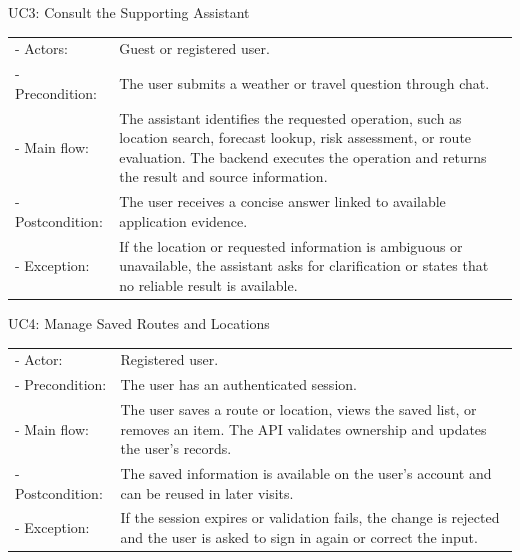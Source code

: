\begin{samepage}
\noindent UC3: Consult the Supporting Assistant\par\medskip
\begin{tabularx}{\textwidth}{@{}p{2.75cm}@{\quad}X@{}}
- Actors: & Guest or registered user. \\
- Precondition: & The user submits a weather or travel question through chat. \\
- Main flow: & The assistant identifies the requested operation, such as location search, forecast lookup, risk assessment, or route evaluation. The backend executes the operation and returns the result and source information. \\
- Postcondition: & The user receives a concise answer linked to available application evidence. \\
- Exception: & If the location or requested information is ambiguous or unavailable, the assistant asks for clarification or states that no reliable result is available. \\
\end{tabularx}
\medskip
\end{samepage}

\begin{samepage}
\noindent UC4: Manage Saved Routes and Locations\par\medskip
\begin{tabularx}{\textwidth}{@{}p{2.75cm}@{\quad}X@{}}
- Actor: & Registered user. \\
- Precondition: & The user has an authenticated session. \\
- Main flow: & The user saves a route or location, views the saved list, or removes an item. The API validates ownership and updates the user's records. \\
- Postcondition: & The saved information is available on the user's account and can be reused in later visits. \\
- Exception: & If the session expires or validation fails, the change is rejected and the user is asked to sign in again or correct the input. \\
\end{tabularx}
\medskip
\end{samepage}

